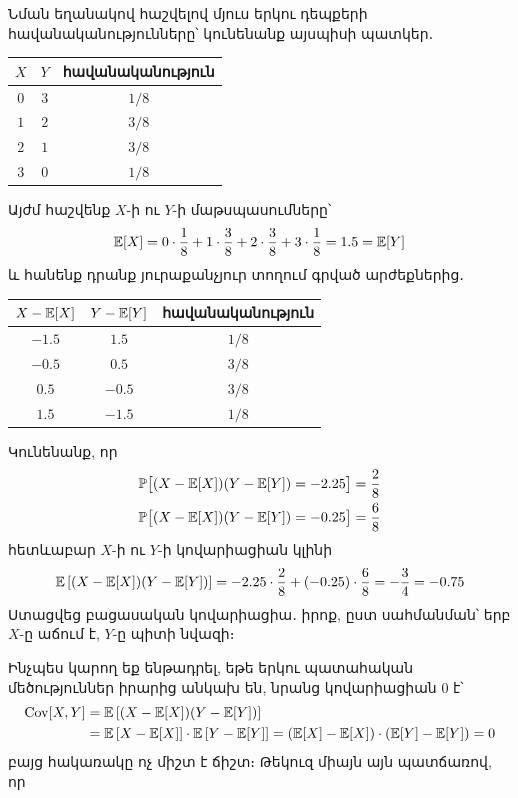 \begin{example}
Նման եղանակով հաշվելով մյուս երկու դեպքերի հավանականություն\-ները՝ կունենանք այսպիսի պատկեր․
\begin{center}
  \begin{tabular}{|c|c|c|}
    \hline
    $X$ & $Y$ & \textbf{հավանականություն} \\
    \hline
    $0$ & $3$ & $1/8$ \\
    \hline
    $1$ & $2$ & $3/8$ \\
    \hline
    $2$ & $1$ & $3/8$ \\
    \hline
    $3$ & $0$ & $1/8$ \\
    \hline
  \end{tabular}
\end{center}
Այժմ հաշվենք $X$-ի ու $Y$-ի մաթսպասումները՝
\[
\mathbb{E}[X] = 
0 \cdot \frac{1}{8} +
1 \cdot \frac{3}{8} +
2 \cdot \frac{3}{8} +
3 \cdot \frac{1}{8} =
1.5 = \mathbb{E}[Y]
\]
և հանենք դրանք յուրաքանչյուր տողում գրված արժեքներից․
\begin{center}
  \begin{tabular}{|c|c|c|}
    \hline
    $X - \mathbb{E}[X]$ & $Y - \mathbb{E}[Y]$ & \textbf{հավանականություն} \\
    \hline
    $-1.5$ & $1.5$ & $1/8$ \\
    \hline
    $-0.5$ & $0.5$ & $3/8$ \\
    \hline
    $0.5$ & $-0.5$ & $3/8$ \\
    \hline
    $1.5$ & $-1.5$ & $1/8$ \\
    \hline
  \end{tabular}
\end{center}
Կունենանք, որ 
\begin{align*}
\mathbb{P}\big[(X - \mathbb{E}[X])(Y - \mathbb{E}[Y]) = -2.25\big] &= \frac{2}{8}\\
\mathbb{P}\big[(X - \mathbb{E}[X])(Y - \mathbb{E}[Y]) = -0.25\big] &= \frac{6}{8}
\end{align*}
հետևաբար $X$-ի ու $Y$-ի կովարիացիան կլինի 
\[
\mathbb{E}\left[(X - \mathbb{E}[X])(Y - \mathbb{E}[Y])\right]
= -2.25 \cdot \frac{2}{8} + (-0.25) \cdot \frac{6}{8}
= -\frac{3}{4} = -0.75
\]
Ստացվեց բացասական կովարիացիա․ իրոք, ըստ սահմանման՝ երբ $X$-ը աճում է, $Y$-ը պիտի նվազի։
\end{example}


Ինչպես կարող եք ենթադրել, եթե երկու պատահական մեծություններ իրարից անկախ են, նրանց կովարիացիան $0$ է՝
\begin{align*}
\operatorname{Cov}[X, Y] &= \mathbb{E}\left[(X - \mathbb{E}[X])(Y - \mathbb{E}[Y])\right]
\\&= \mathbb{E}\left[X - \mathbb{E}[X]\right] \cdot \mathbb{E}\left[Y - \mathbb{E}[Y]\right]
= (\mathbb{E}[X] - \mathbb{E}[X]) \cdot (\mathbb{E}[Y] - \mathbb{E}[Y]) = 0
\end{align*}
բայց հակառակը ոչ միշտ է ճիշտ։ Թեկուզ միայն այն պատճառով, որ

